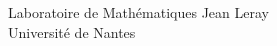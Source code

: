 \documentclass[a4paper, 11pt,openany]{book}%
\newtheorem[L]{thm}{Théorème}[section]
\newtheorem[M]{propo}[thm]{Proposition}
\newtheorem[M]{prop}[thm]{Propriété}
\newtheorem[M]{coro}[thm]{Corollaire}
\newtheorem[M]{lem}[thm]{Lemme}
\newtheorem[M,bodystyle=]{defi}[thm]{Définition}
\newtheorem[M,bodystyle=]{remark}[thm]{Remarque}
\newtheorem[M,bodystyle=]{met}[thm]{Méthode}
\newtheorem[M,bodystyle=]{ret}[thm]{A retenir}
\newtheorem[M,bodystyle=]{idee}[thm]{Idée}
\newtheorem[style=S,underline=false,bodystyle=]{exem}[thm]{Exemple}
\newtheorem[S,underline=false,bodystyle=]{exo}[thm]{Exercice}
\newtheorem[S,underline=false,bodystyle=]{appli}[thm]{Application}
\newtheorem[S,underline=false,bodystyle=]{sol}[thm]{Solution}
\newtheorem[S,underline=false,bodystyle=]{hypo}[thm]{Hypothesis}
\newtheorem[S,underline=false,bodystyle=]{nota}[thm]{Notation}
\begin{document}
\begin{titlepage}
\begin{sffamily}
\begin{center}
\begin{minipage}{0.4\textwidth}
    \end{minipage}

    \hspace{1cm}


    \begin{minipage}{0.5\textwidth}

      \begin{flushright} \large

         Laboratoire de Mathématiques Jean Leray \\

        Université de Nantes

      \end{flushright}

    \end{minipage}

    

    




















\end{center}
\end{sffamily}
\end{titlepage}
\end{document}
